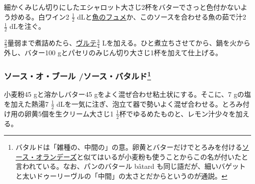 \begin{recette}

 

細かくみじん切りにしたエシャロット大さじ2杯をバターでさっと色付かないよう炒める。白ワイン2
\(\frac{1}{2}\)
dLと\protect\hyperlink{fumet-de-poisson}{魚のフュメ}か、このソースを合わせる魚の茹で汁2
\(\frac{1}{2}\) dLを注ぐ。

\(\frac{2}{3}\)量弱まで煮詰めたら、\protect\hyperlink{veloute-de-poisson}{ヴルテ}\(\frac{3}{4}\)
Lを加える。ひと煮立ちさせてから、鍋を火から外し、バター100
gとパセリのみじん切り大さじ1杯を加えて仕上げる。

\hypertarget{sauce-au-beurre}{%
\subsubsection[ソース・オ・ブール
/ソース・バタルド]{\texorpdfstring{ソース・オ・ブール
/ソース・バタルド\footnote{バタルドは「雑種の、中間の」の意。卵黄とバターだけでとろみを付ける\protect\hyperlink{sauce-hollandaise}{ソース・オランデーズ}と似てはいるが小麦粉も使うことからこの名が付いたと言われている。なお、パンのバタール
  bâtard
  も同じ語だが、細いバゲットと太いドゥーリーヴルの「中間」の太さとだからというのが通説。}}{ソース・オ・ブール /ソース・バタルド}}\label{sauce-au-beurre}}



小麦粉45 gと溶かしバター45 gをよく混ぜ合わせ粘土状にする。そこに、7
gの塩を加えた熱湯7 \(\frac{1}{2}\)
dLを一気に注ぎ、泡立て器で勢いよく混ぜ合わせる。とろみ付け用の卵黄5個を生クリーム大さじ1
\(\frac{1}{2}\)杯でゆるめたものと、レモン汁少々を加える。


\end{recette}
